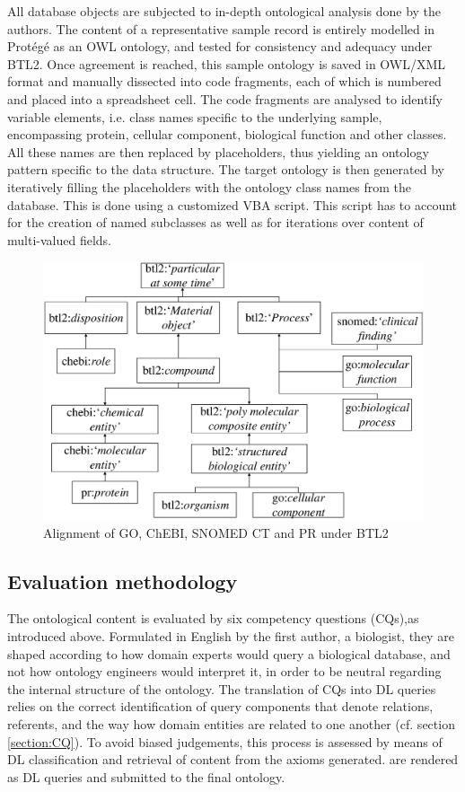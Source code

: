 All database objects are subjected to in-depth ontological analysis done by the authors. The content of a representative 
sample record is entirely modelled in Prot\'{e}g\'{e} as an OWL ontology, and tested for consistency and adequacy under BTL2. Once agreement is reached, this sample ontology is saved in OWL/XML format and manually dissected into code fragments, each of which is numbered and placed into a spreadsheet cell.  The code fragments are analysed to identify variable elements, i.e. class names specific to the underlying sample, encompassing protein, cellular component, biological function and other classes. All these names are then replaced by placeholders, thus yielding an ontology pattern specific to the data structure. 
The target ontology is then generated by iteratively filling the placeholders with the ontology class names from the database. This is done using a customized VBA script. This script has to account for the creation of named subclasses as well as for iterations over content of multi-valued fields.  
 
\begin{figure}[H]
	\centering
	\includegraphics{./PIC/HierarquiaURI}
	\caption{Alignment of GO, ChEBI, SNOMED CT and PR under BTL2} 
	\label{fig:HierarquiaURI}
\end{figure}

%

\subsection{Evaluation methodology} \label{EvaluationMethodology}
The ontological content is evaluated by six competency questions (CQs),as introduced above. Formulated in English by the first author, a biologist, they are shaped according to how domain experts would query a biological database, and not how ontology engineers would interpret it, in order to be neutral regarding the internal structure of the ontology.
The translation of CQs into DL queries relies on the correct identification of query components that denote relations, referents, and the way how domain entities are related to one another (cf. section \ref{section:CQ}). To avoid biased judgements, this process is assessed by means of DL 
classification and retrieval of content from the axioms generated. %
are rendered as DL queries and submitted to the final ontology.

